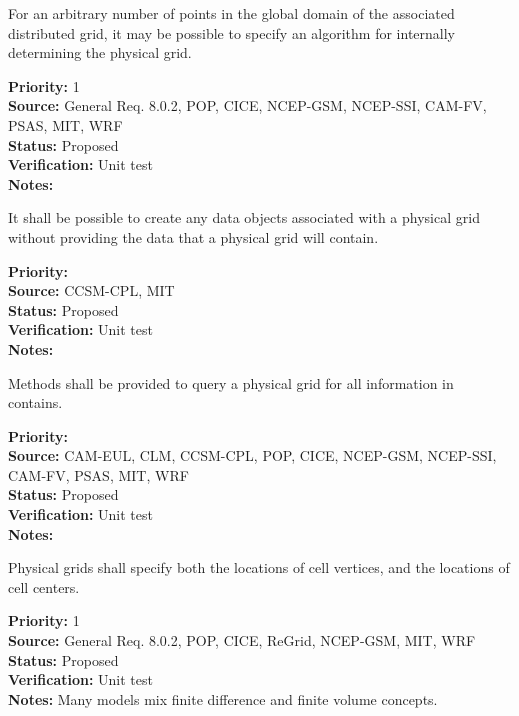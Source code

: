 For an arbitrary number of points in the global domain of the associated
distributed grid, it may be possible to specify an algorithm for internally
determining the physical grid.
\begin{reqlist}
{\bf Priority:} 1 \\
{\bf Source:} General Req. 8.0.2, POP, CICE, NCEP-GSM, NCEP-SSI,
              CAM-FV, PSAS, MIT, WRF \\
{\bf Status:} Proposed \\
{\bf Verification:} Unit test\\
{\bf Notes:} 
\end{reqlist}

It shall be possible to create any data objects associated with a physical grid without
providing the data that a physical grid will contain.
\begin{reqlist}
{\bf Priority:} \\
{\bf Source:} CCSM-CPL, MIT \\
{\bf Status:} Proposed \\
{\bf Verification:} Unit test\\
{\bf Notes:} 
\end{reqlist}

Methods shall be provided to query a physical grid for all information in contains.
\begin{reqlist}
{\bf Priority:} \\
{\bf Source:} CAM-EUL, CLM, CCSM-CPL, POP, CICE, NCEP-GSM, NCEP-SSI,
              CAM-FV, PSAS, MIT, WRF \\
{\bf Status:} Proposed \\
{\bf Verification:} Unit test\\
{\bf Notes:} 
\end{reqlist}

Physical grids shall specify both the locations of cell vertices, and the locations
of cell centers.
\begin{reqlist}
{\bf Priority:} 1 \\
{\bf Source:} General Req. 8.0.2, POP, CICE, ReGrid, NCEP-GSM, MIT, WRF \\
{\bf Status:} Proposed \\
{\bf Verification:} Unit test\\
{\bf Notes:} Many models mix finite difference and finite volume concepts.
\end{reqlist}

